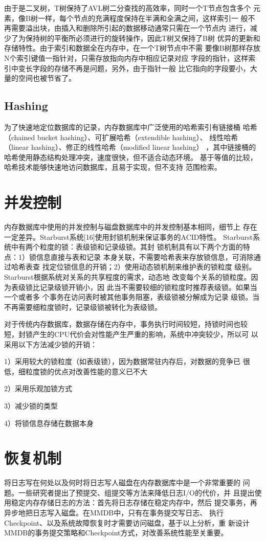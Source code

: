 \documentclass[literaturereview]{zjutreport}
\begin{document}
由于是二叉树，T树保持了AVL树二分查找的高效率，同时一个T节点包含多个
元素，像B树一样，每个节点的充满程度保持在半满和全满之间，这样索引一
般不再需要溢出块，由插入和删除所引起的数据移动通常只需在一个节点内
进行，减少了为保持树的平衡所必须进行的旋转操作，因此T树又保持了B树
优异的更新和存储特性。由于索引和数据全在内存中，在一个T树节点中不需
要像B树那样存放N个索引键值一指针对，只需存放指向内存中相应记录对应
字段的指针，这样索引中变长字段的存储不再是问题，另外，由于指针一般
比它指向的字段要小，大量的空间也被节省了。

\subsection{Hashing}
为了快速地定位数据库的记录，内存数据库中广泛使用的哈希索引有链接桶
哈希（chained bucket hashing）、可扩展哈希（extendible hashing）、
线性哈希（linear hashing）、修正的线性哈希（modified linear hashing）
，其中链接桶的哈希使用静态结构处理冲突，速度很快，但不适合动态环境。
基于等值的比较，哈希技术能够快速地访问数据库，且易于实现，但不支持
范围检索。

\section{并发控制}
内存数据库中使用的并发控制与磁盘数据库中的并发控制基本相同，细节上
存在一定差异。Starburst系统[16]使用封锁机制来保证事务的ACID特性。
Starburst系统中有两个粒度的锁：表级锁和记录级锁。其封
锁机制具有以下两个方面的特点：1）锁信息直接与表和记录
本身关联，不需要哈希表来存放锁信息，可消除通过哈希表查
找定位锁信息的开销；2）使用动态锁机制来维护表的锁粒度
级别。Starburst根据系统对关系的共享程度的需求，动态地
改变每个关系的锁粒度。因为表级锁比记录级锁开销小，因
此当不需要较细的锁粒度时推荐表级锁。如果当一个或者多
个事务在访问表时被其他事务阻塞，表级锁被分解成为记录
级锁。当不再需要细粒度锁时，记录级锁被转化为表级锁。

对于传统内存数据库，数据存储在内存中，事务执行时间较短，持锁时间也较
短，封锁产生的CPU代价会对性能产生严重的影响，系统中冲突较少，所以可
以采用以下方法减少锁的开销：

1）采用较大的锁粒度（如表级锁），因为数据常驻内存后，对数据的竞争已
很低，细粒度锁的优点对改善性能的意义已不大

2）采用乐观加锁方式

3）减少锁的类型

4）将锁信息存储在数据本身

\section{恢复机制}
将日志写在何处以及何时将日志写人磁盘在内存数据库中是一个非常重要的
问题。一些研究者提出了预提交、组提交等方法来降低日志I/O的代价，并
且提出使用稳定内存存储日志的方法：首先将日志存储在稳定内存中，然后
提交事务，再异步地把日志写入磁盘。在MMDB中，只有在事务提交写日志、
执行Checkpoint、以及系统故障恢复时才需要访问磁盘，基于以上分析，重
新设计MMDB的事务提交策略和Checkpoint方式，对改善系统性能至关重要。
\end{document}
